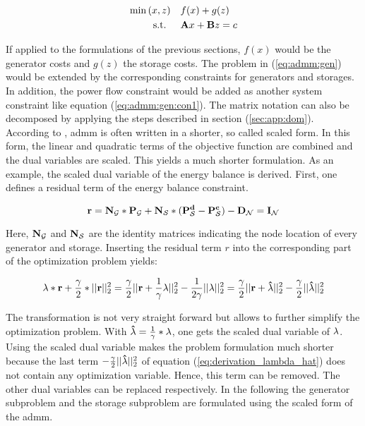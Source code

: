 \begin{subequations}
	\begin{align}
		\min{(x, z)} \quad & f(x) + g(z) \label{eq:admm:gen}\\
		\text{s.t. } \quad & \vb{A}x + \vb{B}z = c \label{eq:admm:gen:con1}
	\end{align}
\end{subequations}

If applied to the formulations of the previous sections, $f(x)$ would be the generator costs and $g(z)$ the storage costs. The problem in (\ref{eq:admm:gen}) would be extended by the corresponding constraints for generators and storages. In addition, the power flow constraint would be added as another system constraint like equation (\ref{eq:admm:gen:con1}). The matrix notation can also be decomposed by applying the steps described in section (\ref{sec:app:dom}). \\

According to \citet{boyd2010}, \gls{admm} is often written in a shorter, so called scaled form. In this form, the linear and quadratic terms of the objective function are combined and the dual variables are scaled. This yields a much shorter formulation. As an example, the scaled dual variable of the energy balance is derived. First, one defines a residual term of the energy balance constraint.

\begin{equation}
	\vb{r} = \vb{N_\mathcal{G}}*\vb{P_\mathcal{G}} + \vb{N_\mathcal{S}}*(\vb{P_\mathcal{S}^d} - \vb{P_\mathcal{S}^c}) - \vb{D_\mathcal{N}} = \vb{I_\mathcal{N}}
\end{equation}

Here, $\vb{N_\mathcal{G}}$ and $\vb{N_\mathcal{S}}$ are the identity matrices indicating the node location of every generator and storage. Inserting the residual term $r$ into the corresponding part of the optimization problem yields:

\begin{equation}
	\vb{\lambda} * \vb{r} + \frac{\gamma}{2} * || \vb{r} ||^2_2 = \frac{\gamma}{2} || \vb{r} + \frac{1}{\gamma}\vb{\lambda} ||^2_2 - \frac{1}{2\gamma}|| \vb{\lambda} ||^2_2 = \frac{\gamma}{2} || \vb{r} + \vb{\hat{\lambda}} ||^2_2 - \frac{\gamma}{2}|| \vb{\hat{\lambda}} ||^2_2 \label{eq:derivation_lambda_hat}
\end{equation}

The transformation is not very straight forward but allows to further simplify the  optimization problem. With $\vb{\hat{\lambda}} = \frac{1}{\gamma}*\vb{\lambda}$, one gets the scaled dual variable of $\vb{\lambda}$. Using the scaled dual variable makes the problem formulation much shorter because the last term $- \frac{\gamma}{2}|| \vb{\hat{\lambda}} ||^2_2$ of equation (\ref{eq:derivation_lambda_hat}) does not contain any optimization variable. Hence, this term can be removed. The other dual variables can be replaced respectively. In the following the generator subproblem and the storage subproblem are formulated using the scaled form of the \gls{admm}.

